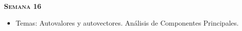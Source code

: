 \documentclass[letterpaper,10pt,onecolumn]{article}
\begin{document}
\noindent\textbf{\textsc{Semana 16}}\\[-0.5cm]
\begin{itemize}
\item Temas: Autovalores y autovectores. An\'alisis de Componentes Principales. \\[-0.6cm]
\end{itemize}







\end{document}
